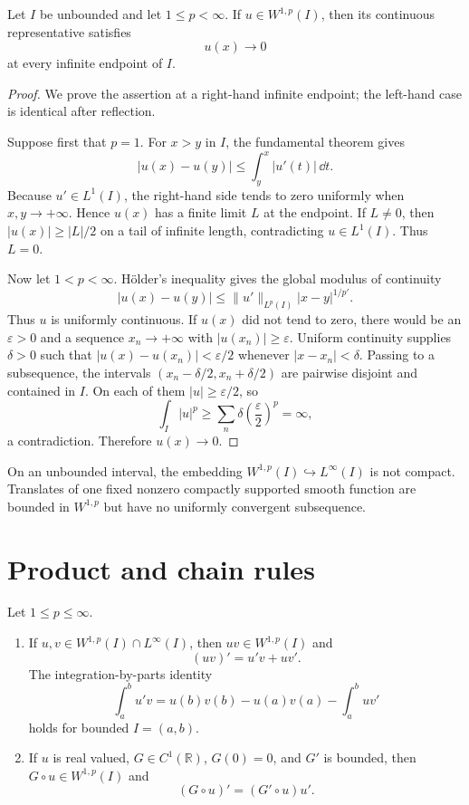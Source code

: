 \begin{notecorollary}
Let $I$ be unbounded and let $1\le p<\infty$.  If $u\in W^{1,p}(I)$, then its
continuous representative satisfies
\[
  u(x)\longrightarrow0
\]
at every infinite endpoint of $I$.
\end{notecorollary}

\begin{proof}
We prove the assertion at a right-hand infinite endpoint; the left-hand case
is identical after reflection.

Suppose first that $p=1$.  For $x>y$ in $I$, the fundamental theorem gives
\[
  |u(x)-u(y)|\le\int_y^x|u'(t)|\,\dd t.
\]
Because $u'\in L^1(I)$, the right-hand side tends to zero uniformly when
$x,y\to+\infty$.  Hence $u(x)$ has a finite limit $L$ at the endpoint.  If
$L\ne0$, then $|u(x)|\ge |L|/2$ on a tail of infinite length, contradicting
$u\in L^1(I)$.  Thus $L=0$.

Now let $1<p<\infty$.  Hölder's inequality gives the global modulus of
continuity
\[
  |u(x)-u(y)|
  \le \|u'\|_{L^p(I)}|x-y|^{1/p'}.
\]
Thus $u$ is uniformly continuous.  If $u(x)$ did not tend to zero, there
would be an $\varepsilon>0$ and a sequence $x_n\to+\infty$ with
$|u(x_n)|\ge\varepsilon$.  Uniform continuity supplies $\delta>0$ such that
$|u(x)-u(x_n)|<\varepsilon/2$ whenever $|x-x_n|<\delta$.  Passing to a
subsequence, the intervals
$(x_n-\delta/2,x_n+\delta/2)$ are pairwise disjoint and contained in $I$.
On each of them $|u|\ge\varepsilon/2$, so
\[
  \int_I|u|^p
  \ge \sum_n \delta\left(\frac\varepsilon2\right)^p
  =\infty,
\]
a contradiction.  Therefore $u(x)\to0$.
\end{proof}

\begin{noteremark}
On an unbounded interval, the embedding
$W^{1,p}(I)\hookrightarrow L^\infty(I)$ is not compact.  Translates of one
fixed nonzero compactly supported smooth function are bounded in $W^{1,p}$ but
have no uniformly convergent subsequence.
\end{noteremark}

\section{Product and chain rules}

\begin{noteproposition}
Let $1\le p\le\infty$.
\begin{enumerate}
  \item If $u,v\in W^{1,p}(I)\cap L^\infty(I)$, then
        $uv\in W^{1,p}(I)$ and
        \[
          (uv)'=u'v+uv'.
        \]
        The integration-by-parts identity
        \[
          \int_a^b u'v
          =u(b)v(b)-u(a)v(a)-\int_a^buv'
        \]
        holds for bounded $I=(a,b)$.
  \item If $u$ is real valued, $G\in C^1(\mathbb R)$,
        $G(0)=0$, and $G'$ is bounded, then
        $G\circ u\in W^{1,p}(I)$ and
        \[
          (G\circ u)'=(G'\circ u)u'.
        \]
\end{enumerate}
\end{noteproposition}

